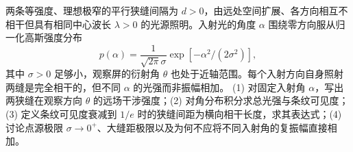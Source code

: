 两条等强度、理想极窄的平行狭缝间隔为 \(d>0\)，由远处空间扩展、各方向相互不相干但具有相同中心波长 \(\lambda>0\) 的光源照明。入射光的角度 \(\alpha\) 围绕零方向服从归一化高斯强度分布
\[
p(\alpha)=\frac1{\sqrt{2\pi}\sigma}\exp[-\alpha^2/(2\sigma^2)],
\]
其中 \(\sigma>0\) 足够小，观察屏的衍射角 \(\theta\) 也处于近轴范围。每个入射方向自身照射两缝是完全相干的，但不同 \(\alpha\) 的光强而非振幅相加。
(1) 对固定入射角 \(\alpha\)，写出两狭缝在观察方向 \(\theta\) 的远场干涉强度；(2) 对角分布积分求总光强与条纹可见度；(3) 定义条纹可见度衰减到 \(1/e\) 时的狭缝间距为横向相干长度，求其表达式；(4) 讨论点源极限 \(\sigma\to0^+\)、大缝距极限以及为何不应将不同入射角的复振幅直接相加。
